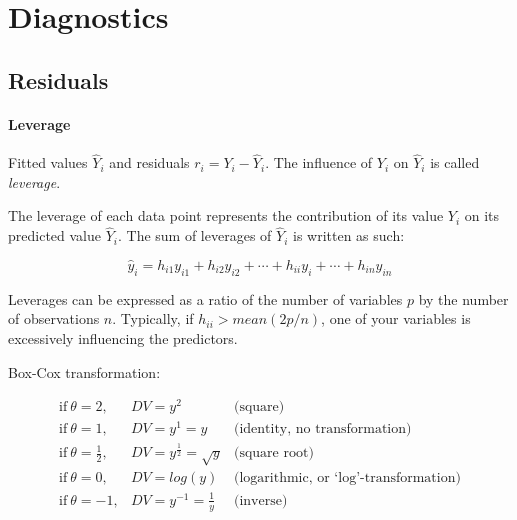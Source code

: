 %
%
%
\section{Diagnostics}%
  \label{sec:diagnostics}%

	\subsection{Residuals}%
  	\label{sec:residuals}%


  	\paragraph{Leverage}%
      Fitted values $\hat{Y}_i$ and residuals $r_i = Y_i - \hat{Y}_i$. The influence of $Y_i$ on $\hat{Y}_i$ is called \emph{leverage}.%
	
  	The leverage of each data point represents the contribution of its value $Y_i$ on its predicted value $\hat{Y}_i$. The sum of leverages of $\hat{Y}_i$ is written as such:%

  	$$\hat{y}_i = h_{i1}y_{i1} + h_{i2}y_{i2} + \cdots + h_{ii}y_i + \cdots + h_{in}y_{in}$$
	
  	Leverages can be expressed as a ratio of the number of variables $p$ by the number of observations $n$. Typically, if $h_{ii} > mean(2p/n)$, one of your variables is excessively influencing the predictors.%
	
  	Box-Cox transformation:

  	$$
  	\begin{array}{rll}
  	  \text{if}~\theta = 2, & DV = y^{2}   &  \text{(square)} \\
  	  \text{if}~\theta = 1, & DV = y^{1} = y   &  \text{(identity, no transformation)} \\

  	  \text{if}~\theta = \frac{1}{2}, & DV = y^{\frac{1}{2}} = \sqrt{y} &  \text{(square root)} \\

  	  \text{if}~\theta = 0, &  DV = log(y)  &  \text{(logarithmic, or `log'-transformation)} \\

  	  \text{if}~\theta = -1, &  DV = y^{-1} = \frac{1}{y}  &  \text{(inverse)}
  	\end{array}
  	$$

